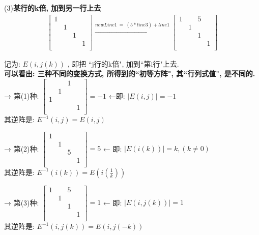 \documentclass[UTF8]{ctexart}
\begin{document}
(3)\textbf{某行的k倍, 加到另一行上去}
\begin{align*}
	\left[ \begin{matrix}
		1&		&		&		\\
		&		1&		&		\\
		&		&		1&		\\
		&		&		&		1\\
	\end{matrix} \right] \overset{newLine1\ =\ (5* line3)+line1}{\rightarrow}\left[ \begin{matrix}
		1&		&		5&		\\
		&		1&		&		\\
		&		&		1&		\\
		&		&		&		1\\
	\end{matrix} \right]
\end{align*}

记为:  $ E(i, j(k))$ , 即把 ``j行的k倍", 加到``第i行"上去.\\

\textbf{可以看出: 三种不同的变换方式, 所得到的``初等方阵", 其``行列式值", 是不同的.} \\

→ 第(1)种: 
$	\left[ \begin{matrix}
	&		&		1&		\\
	&		1&		&		\\
	1&		&		&		\\
	&		&		&		1\\
\end{matrix} \right] =-1$ ←即: $\boxed{|E(i,j)| = -1}$ \\
其逆阵是: $\boxed{E^{-1}(i,j) = E(i,j)}$\\
\vspace{1em} 

→ 第(2)种:
$\left[ \begin{matrix}
	1&		&		&		\\
	&		1&		&		\\
	&		&		5&		\\
	&		&		&		1\\
\end{matrix} \right] =5$  ← 即: $\boxed{ |E(i(k))| = k, (k \ne 0)}$\\
其逆阵是: $\boxed{E^{-1}(i(k)) = E(i(\frac{1}{k}))}$\\
\vspace{1em} 

→ 第(3)种:
$\left[ \begin{matrix}
	1&		&		5&		\\
	&		1&		&		\\
	&		&		1&		\\
	&		&		&		1\\
\end{matrix} \right] =1$ ← 即: $\boxed{|E(i, j(k))| = 1}$\\
其逆阵是: $\boxed{E^{-1}(i, j(k)) = E(i,j(-k))}$\\
\end{document}
